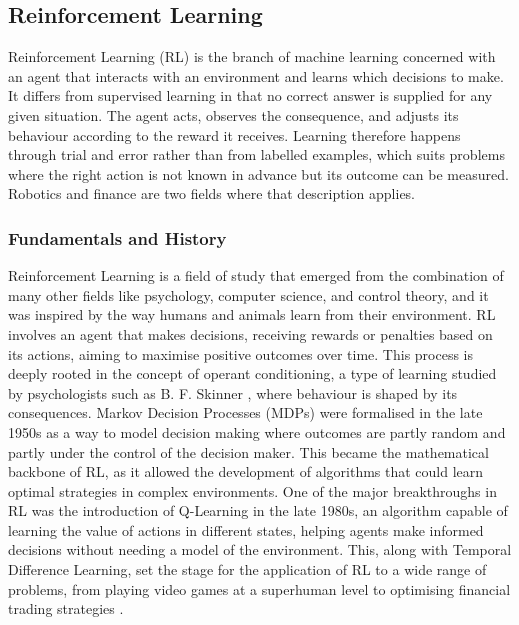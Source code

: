 \subsection{Reinforcement Learning}
\label{Subsection:ReinforcementLearning}

Reinforcement Learning (RL) is the branch of machine learning concerned with an agent that interacts with an environment and learns which decisions to make. It differs from supervised learning in that no correct answer is supplied for any given situation. The agent acts, observes the consequence, and adjusts its behaviour according to the reward it receives. Learning therefore happens through trial and error rather than from labelled examples, which suits problems where the right action is not known in advance but its outcome can be measured. Robotics and finance are two fields where that description applies.

\subsubsection{Fundamentals and History}

Reinforcement Learning is a field of study that emerged from the combination of many other fields like psychology, computer science, and control theory, and it was inspired by the way humans and animals learn from their environment. RL involves an agent that makes decisions, receiving rewards or penalties based on its actions, aiming to maximise positive outcomes over time. This process is deeply rooted in the concept of operant conditioning, a type of learning studied by psychologists such as B. F. Skinner \cite{skinner_operant_1963}, where behaviour is shaped by its consequences. Markov Decision Processes (MDPs) were formalised in the late 1950s as a way to model decision making where outcomes are partly random and partly under the control of the decision maker. This became the mathematical backbone of RL, as it allowed the development of algorithms that could learn optimal strategies in complex environments. One of the major breakthroughs in RL was the introduction of Q-Learning in the late 1980s, an algorithm capable of learning the value of actions in different states, helping agents make informed decisions without needing a model of the environment. This, along with Temporal Difference Learning, set the stage for the application of RL to a wide range of problems, from playing video games at a superhuman level to optimising financial trading strategies \cite{sutton_reinforcement_2018}.

